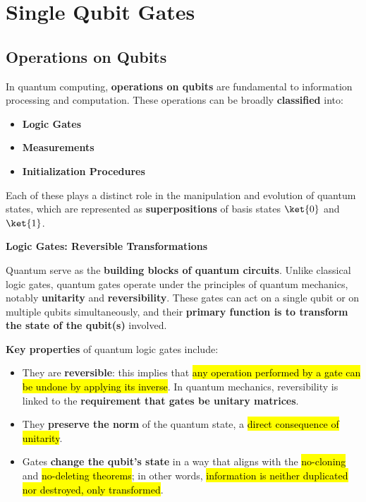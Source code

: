 \section{Single Qubit Gates}

\subsection{Operations on Qubits}

In quantum computing, \textbf{operations on qubits} are fundamental to information processing and computation. These operations can be broadly \textbf{classified} into:
\begin{itemize}
    \item \textbf{Logic Gates}
    \item \textbf{Measurements}
    \item \textbf{Initialization Procedures}
\end{itemize}
Each of these plays a distinct role in the manipulation and evolution of quantum states, which are represented as \textbf{superpositions} of basis states $\ket{0}$ and $\ket{1}$.

\highspace
\begin{flushleft}
    \textcolor{Green3}{ \textbf{Logic Gates: Reversible Transformations}}
\end{flushleft}
Quantum  serve as the \textbf{building blocks of quantum circuits}. Unlike classical logic gates, quantum gates operate under the principles of quantum mechanics, notably \textbf{unitarity} and \textbf{reversibility}. These gates can act on a single qubit or on multiple qubits simultaneously, and their \textbf{primary function is to transform the state of the qubit(s)} involved.

\highspace
\textbf{Key properties} of quantum logic gates include:
\begin{itemize}
    \item They are \textbf{reversible}: this implies that \hl{any operation performed by a gate can be undone by applying its inverse}. In quantum mechanics, reversibility is linked to the \textbf{requirement that gates be unitary matrices}.

    \item They \textbf{preserve the norm} of the quantum state, a \hl{direct consequence of unitarity}.
    \item Gates \textbf{change the qubit's state} in a way that aligns with the \hl{no-cloning} and \hl{no-deleting theorems}; in other words, \hl{information is neither duplicated nor destroyed, only transformed}.
\end{itemize}

